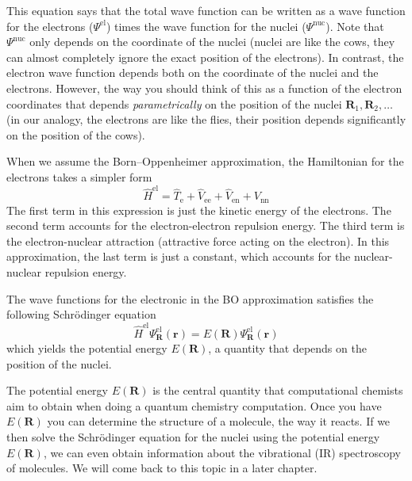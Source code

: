 \documentclass[../Main/chem371-notes.tex]{subfiles}
\begin{document}
This equation says that the total wave function can be written as a wave function for the electrons ($\Psi^\mathrm{el}$) times the wave function for the nuclei ($\Psi^\mathrm{nuc}$).
Note that $\Psi^\mathrm{nuc}$ only depends on the coordinate of the nuclei (nuclei are like the cows, they can almost completely ignore the exact position of the electrons).
In contrast, the electron wave function depends both on the coordinate of the nuclei and the electrons.
However, the way you should think of this as a function of the electron coordinates that depends \emph{parametrically} on the position of the nuclei $ \mathbf{R}_1,  \mathbf{R}_2,\ldots$ (in our analogy, the electrons are like the flies, their position depends significantly on the position of the cows).

When we assume the Born--Oppenheimer approximation, the Hamiltonian for the electrons takes a simpler form
\begin{equation}
\hat{H}^\mathrm{el} = \hat{T}_\mathrm{e} + \hat{V}_\mathrm{ee} + \hat{V}_\mathrm{en} + V_\mathrm{nn}
\end{equation}
The first term in this expression is just the kinetic energy of the electrons. The second term accounts for the electron-electron repulsion energy. The third term is the electron-nuclear attraction (attractive force acting on the electron). In this approximation, the last term is just a constant, which accounts for the nuclear-nuclear repulsion energy.

The wave functions for the electronic in the BO approximation satisfies the following Schr\"{o}dinger equation
\begin{equation}
\hat{H}^\mathrm{el}\Psi_{\mathbf{R}}^\mathrm{el}(\mathbf{r}) =
E(\mathbf{R})
\Psi_{\mathbf{R}}^\mathrm{el}(\mathbf{r})
\end{equation}
which yields the potential energy $E(\mathbf{R})$, a quantity that depends on the position of the nuclei.

The  potential energy $E(\mathbf{R})$ is the central quantity that computational chemists aim to obtain when doing a quantum chemistry computation.
Once you have $E(\mathbf{R})$ you can determine the structure of a molecule, the way it reacts.
If we then solve the Schr\"{o}dinger equation for the nuclei using the potential energy $E(\mathbf{R})$, we can even obtain information about the vibrational (IR) spectroscopy of molecules. 
We will come back to this topic in a later chapter.
\end{document}
